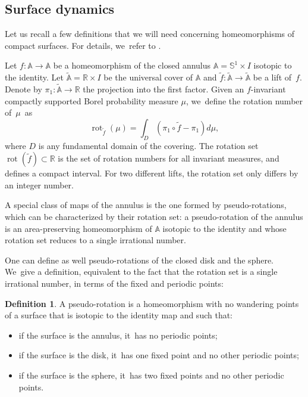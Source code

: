 \documentclass[JEP,XML,SOM,Unicode,NoEqCountersInSection,NoFloatCountersInSection,published]{cedram}
\theoremstyle{definition}
\newtheorem{defi}[theorem]{Definition}
\newcommand{\mS}{\mathbb{S}}
\begin{document}
\subsection{Surface dynamics}\label{ssec-surfacedyn}
Let us recall a few definitions that we will need concerning homeomorphisms of compact surfaces. For details, we~refer to \cite{BCLP, Lec1}.

Let $f: \mathbb{A}\to \mathbb{A}$ be a homeomorphism of the closed annulus $\mathbb{A}=\mS^1\times I$ isotopic to the identity. Let $\widetilde{\mathbb{A}}=\mathbb{R}\times I$ be
the universal cover of $\mathbb{A}$ and $\widetilde f: \widetilde{\mathbb{A}} \to \widetilde{\mathbb{A}}$ be a lift of~$f$. Denote by $\pi_1: \widetilde{\mathbb{A}} \to \mathbb{R}$ the projection into the first factor. Given an $f$-invariant compactly supported Borel probability measure $\mu$, we~define the rotation number of~$\mu$~as
\[
\operatorname{rot}_{\widetilde f}(\mu)=\int_D (\pi_1\circ \widetilde f - \pi_1)d\mu,
\]
where $D$ is any fundamental domain of the covering. The rotation set $\operatorname{rot}(\widetilde f)\subset \mathbb{R}$ is the set of rotation numbers for all invariant measures, and defines a compact interval. For two different lifts, the rotation set only differs by an integer number.

A special class of maps of the annulus is the one formed by pseudo-rotations, which can be characterized by their rotation set:
a pseudo-rotation of the annulus is an area-preserving homeomorphism of $\mathbb{A}$ isotopic to the identity and whose rotation set reduces to a single irrational number.

One can define as well pseudo-rotations of the closed disk and the sphere. We~give a definition, equivalent to the fact that the rotation set is a single irrational number, in terms of the fixed and periodic points:
\begin{defi}
A pseudo-rotation is a homeomorphism with no wandering points of a surface that is isotopic to the identity map and such that:
\begin{itemize}
\item
if the surface is the annulus, it~has no periodic points;
\item
if the surface is the disk, it~has one fixed point and no other periodic points;
\item
if the surface is the sphere, it~has two fixed points and no other periodic points.
\end{itemize}
\end{defi}
\end{document}
